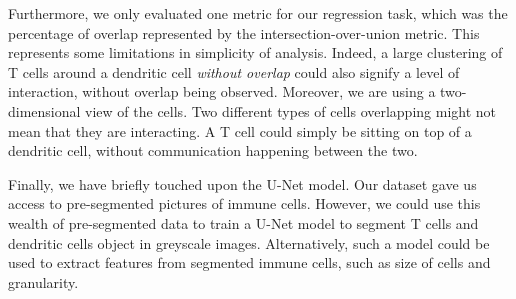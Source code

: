 Furthermore, we only evaluated one metric for our regression task, which was the percentage of overlap represented by the intersection-over-union metric. This represents some limitations in simplicity of analysis. Indeed, a large clustering of T cells around a dendritic cell \textit{without overlap} could also signify a level of interaction, without overlap being observed. Moreover, we are using a two-dimensional view of the cells. Two different types of cells overlapping might not mean that they are interacting. A T cell could simply be sitting on top of a dendritic cell, without communication happening between the two.

Finally, we have briefly touched upon the U-Net model. Our dataset gave us access to pre-segmented pictures of immune cells. However, we could use this wealth of pre-segmented data to train a U-Net model to segment T cells and dendritic cells object in greyscale images. Alternatively, such a model could be used to extract features from segmented immune cells, such as size of cells and granularity. 